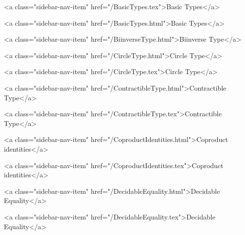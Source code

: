      
        
          <a class="sidebar-nav-item" href="/BasicTypes.tex">Basic Types</a>
        
      
    
      
        
          <a class="sidebar-nav-item" href="/BasicTypes.html">Basic Types</a>
        
      
    
      
        
          <a class="sidebar-nav-item" href="/BiinverseType.html">Biinverse Type</a>
        
      
    
      
        
          <a class="sidebar-nav-item" href="/CircleType.html">Circle Type</a>
        
      
    
      
        
          <a class="sidebar-nav-item" href="/CircleType.tex">Circle Type</a>
        
      
    
      
        
          <a class="sidebar-nav-item" href="/ContractibleType.html">Contractible Type</a>
        
      
    
      
        
          <a class="sidebar-nav-item" href="/ContractibleType.tex">Contractible Type</a>
        
      
    
      
        
          <a class="sidebar-nav-item" href="/CoproductIdentities.html">Coproduct identities</a>
        
      
    
      
        
          <a class="sidebar-nav-item" href="/CoproductIdentities.tex">Coproduct identities</a>
        
      
    
      
        
          <a class="sidebar-nav-item" href="/DecidableEquality.html">Decidable Equality</a>
        
      
    
      
        
          <a class="sidebar-nav-item" href="/DecidableEquality.tex">Decidable Equality</a>
        
